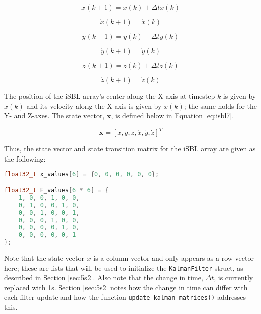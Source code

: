 \documentclass[11pt]{ucthesisCP}
\begin{document}
\begin{equation} \label{eq:isbl1}
	x(k+1) = x(k) + \Delta t \dot{x}(k)
\end{equation}

\begin{equation} \label{eq:isbl2}
	\dot{x}(k+1) = \dot{x}(k)
\end{equation}

\begin{equation} \label{eq:isbl3}
	y(k+1) = y(k) + \Delta t \dot{y}(k)
\end{equation}

\begin{equation} \label{eq:isbl4}
	\dot{y}(k+1) = \dot{y}(k)
\end{equation}

\begin{equation} \label{eq:isbl5}
	z(k+1) = z(k) + \Delta t \dot{z}(k)
\end{equation}

\begin{equation} \label{eq:isbl6}
	\dot{z}(k+1) = \dot{z}(k)
\end{equation}

The position of the iSBL array’s center along the X-axis at timestep \(k\) is given by \(x(k)\) and its velocity along the X-axis is given by \(\dot{x}(k)\); the same holds for the Y- and Z-axes. The state vector, \(\mathbf{x}\), is defined below in Equation \ref{eq:isbl7}. 

\begin{equation} \label{eq:isbl7}
	\mathbf{x} = [x, y, z, \dot{x}, \dot{y}, \dot{z}]^T
\end{equation}

Thus, the state vector and state transition matrix for the iSBL array are given as the following:

\begin{lstlisting}[language=C++]
float32_t x_values[6] = {0, 0, 0, 0, 0, 0};

float32_t F_values[6 * 6] = {
	1, 0, 0, 1, 0, 0,
	0, 1, 0, 0, 1, 0,
	0, 0, 1, 0, 0, 1,
	0, 0, 0, 1, 0, 0,
	0, 0, 0, 0, 1, 0,
	0, 0, 0, 0, 0, 1
};
\end{lstlisting}

Note that the state vector \(x\) is a column vector and only appears as a row vector here; these are lists that will be used to initialize the \verb|KalmanFilter| struct, as described in Section \ref{sec:5s2}. Also note that the change in time, \(\Delta t\), is currently replaced with 1s. Section \ref{sec:5s2} notes how the change in time can differ with each filter update and how the function \verb|update_kalman_matrices()| addresses this.
\end{document}
